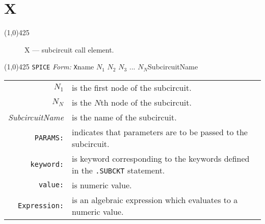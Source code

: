 
\oddsidemargin 10mm \topmargin 0.0in \textwidth 5.5in \textheight 7.375in
\evensidemargin 1.0in \headheight 0.18in \footskip 0.16in
%
\section[X \- Subcircuit Call]{ \hspace{70mm}\huge \textbf{X}}
\linethickness{1mm}
\line(1,0){425}
\normalsize
\begin{figure}[h]
\centerline{\epsfxsize=0.8in} \caption{X ---
subcircuit call element.}
\end{figure}
\newline
\linethickness{0.5mm}
\line(1,0){425}
\newline
\texttt{SPICE} \textit{Form:}
\newline
{\tt X}name $N_1$ \B $N_2$ $N_3$ ... $N_N$\E  SubcircuitName
\newline
\begin{tabular}{r l}
$N_1$ & is the first node of the subcircuit.\\
$N_N$ & is the $N$th node of the subcircuit.\\
{\it SubcircuitName} & is the name of the subcircuit.\\
{\tt PARAMS:} & indicates that parameters are to be passed to the
subcircuit.\\
{\tt keyword:} & is keyword corresponding to the keywords defined
in the {\tt .SUBCKT} statement.\\
{\tt value:} & is numeric value.\\
{\tt Expression:} & is an algebraic expression which evaluates to
a numeric value.\\
\end{tabular}
